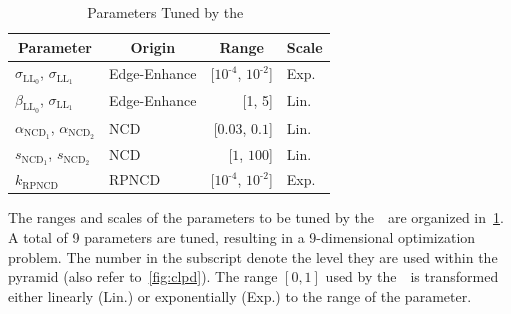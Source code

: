 \begin{table}
  \vspace{-0.15in}
  \centering
  \caption{Parameters Tuned by the~\usdg}\label{table:params}
  \begin{threeparttable}
  \begin{tabular}{llrl}
    \toprule
    \multicolumn{1}{c}{\textbf{Parameter}}
    & \multicolumn{1}{c}{\textbf{Origin}}
    & \multicolumn{1}{c}{\textbf{Range}}
    & \multicolumn{1}{c}{\textbf{Scale}}
    \\ \midrule
    \(\sigma_{\mathrm{LL}_0}\), \(\sigma_{\mathrm{LL}_1}\)  & Edge-Enhance & [\(10^{\text{-}4}\), \(10^{\text{-}2}\)] & Exp.  \\
    \(\beta_{\mathrm{LL}_0}\), \(\sigma_{\mathrm{LL}_1}\)   & Edge-Enhance & [1, 5]                   & Lin. \\
    \(\alpha_{\mathrm{NCD}_1}\), \(\alpha_{\mathrm{NCD}_2}\) & NCD          & [\(0.03\), \(0.1\)]     & Lin.  \\
    \(s_{\mathrm{NCD}_1}\), \(s_{\mathrm{NCD}_2}\)           & NCD          & [\(1\), \(100\)]        & Lin. \\
    \(k_{\text{RPNCD}}\)                                & RPNCD        & [\(10^{\text{-}4}\), \(10^{\text{-}2}\)] & Exp. \\\bottomrule
  \end{tabular}
  \end{threeparttable}
  \vspace{-0.15in}
\end{table}
%
The ranges and scales of the parameters to be tuned by the~\usdg~are organized in~\cref{table:params}.
A total of 9 parameters are tuned, resulting in a 9-dimensional optimization problem.
The number in the subscript denote the level they are used within the pyramid (also refer to~\cref{fig:clpd}).
The range \([0, 1]\) used by the~\usdg~is transformed either linearly (Lin.) or exponentially (Exp.) to the range of the parameter.


